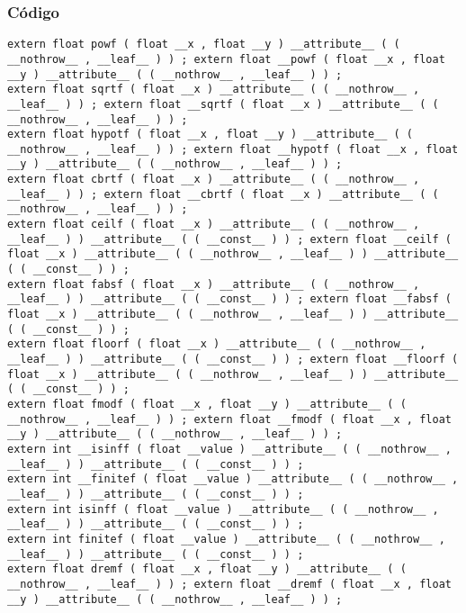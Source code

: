 \documentclass{beamer}
\begin{document}
\begin{frame}[fragile]
\frametitle{C\'odigo}
\begin{verbatim}
extern float powf ( float __x , float __y ) __attribute__ ( ( __nothrow__ , __leaf__ ) ) ; extern float __powf ( float __x , float __y ) __attribute__ ( ( __nothrow__ , __leaf__ ) ) ; 
extern float sqrtf ( float __x ) __attribute__ ( ( __nothrow__ , __leaf__ ) ) ; extern float __sqrtf ( float __x ) __attribute__ ( ( __nothrow__ , __leaf__ ) ) ; 
extern float hypotf ( float __x , float __y ) __attribute__ ( ( __nothrow__ , __leaf__ ) ) ; extern float __hypotf ( float __x , float __y ) __attribute__ ( ( __nothrow__ , __leaf__ ) ) ; 
extern float cbrtf ( float __x ) __attribute__ ( ( __nothrow__ , __leaf__ ) ) ; extern float __cbrtf ( float __x ) __attribute__ ( ( __nothrow__ , __leaf__ ) ) ; 
extern float ceilf ( float __x ) __attribute__ ( ( __nothrow__ , __leaf__ ) ) __attribute__ ( ( __const__ ) ) ; extern float __ceilf ( float __x ) __attribute__ ( ( __nothrow__ , __leaf__ ) ) __attribute__ ( ( __const__ ) ) ; 
extern float fabsf ( float __x ) __attribute__ ( ( __nothrow__ , __leaf__ ) ) __attribute__ ( ( __const__ ) ) ; extern float __fabsf ( float __x ) __attribute__ ( ( __nothrow__ , __leaf__ ) ) __attribute__ ( ( __const__ ) ) ; 
extern float floorf ( float __x ) __attribute__ ( ( __nothrow__ , __leaf__ ) ) __attribute__ ( ( __const__ ) ) ; extern float __floorf ( float __x ) __attribute__ ( ( __nothrow__ , __leaf__ ) ) __attribute__ ( ( __const__ ) ) ; 
extern float fmodf ( float __x , float __y ) __attribute__ ( ( __nothrow__ , __leaf__ ) ) ; extern float __fmodf ( float __x , float __y ) __attribute__ ( ( __nothrow__ , __leaf__ ) ) ; 
extern int __isinff ( float __value ) __attribute__ ( ( __nothrow__ , __leaf__ ) ) __attribute__ ( ( __const__ ) ) ; 
extern int __finitef ( float __value ) __attribute__ ( ( __nothrow__ , __leaf__ ) ) __attribute__ ( ( __const__ ) ) ; 
extern int isinff ( float __value ) __attribute__ ( ( __nothrow__ , __leaf__ ) ) __attribute__ ( ( __const__ ) ) ; 
extern int finitef ( float __value ) __attribute__ ( ( __nothrow__ , __leaf__ ) ) __attribute__ ( ( __const__ ) ) ; 
extern float dremf ( float __x , float __y ) __attribute__ ( ( __nothrow__ , __leaf__ ) ) ; extern float __dremf ( float __x , float __y ) __attribute__ ( ( __nothrow__ , __leaf__ ) ) ; 
\end{verbatim}
\end{frame}
\end{document}
